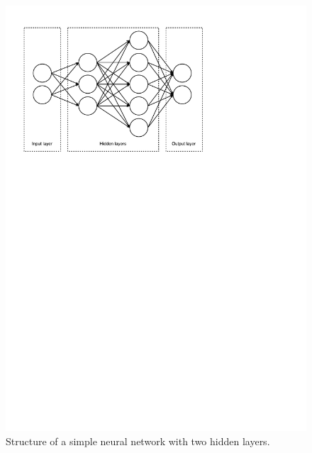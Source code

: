 \documentclass[12pt,a4paper,twoside,openright]{report}
\begin{document}
\begin{figure}
	\centering
	\includegraphics[scale=0.6]{nn_layout}
	\caption{Structure of a simple neural network with two hidden layers.}
	\label{fig:nn_layout}
\end{figure}
\end{document}
